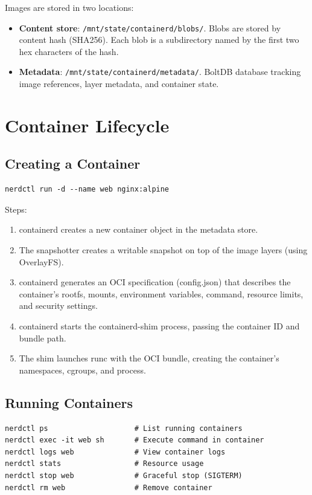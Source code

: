 Images are stored in two locations:

\begin{itemize}[nosep]
  \item \textbf{Content store}: \texttt{/mnt/state/containerd/blobs/}.
        Blobs are stored by content hash (SHA256). Each blob is a
        subdirectory named by the first two hex characters of the hash.
  \item \textbf{Metadata}: \texttt{/mnt/state/containerd/metadata/}.
        BoltDB database tracking image references, layer metadata, and
        container state.
\end{itemize}

\section{Container Lifecycle}

\subsection{Creating a Container}

\begin{lstlisting}
nerdctl run -d --name web nginx:alpine
\end{lstlisting}

Steps:
\begin{enumerate}[nosep]
  \item containerd creates a new container object in the metadata store.
  \item The snapshotter creates a writable snapshot on top of the image
        layers (using OverlayFS).
  \item containerd generates an OCI specification (config.json) that
        describes the container's rootfs, mounts, environment variables,
        command, resource limits, and security settings.
  \item containerd starts the containerd-shim process, passing the
        container ID and bundle path.
  \item The shim launches runc with the OCI bundle, creating the
        container's namespaces, cgroups, and process.
\end{enumerate}

\subsection{Running Containers}

\begin{lstlisting}
nerdctl ps                    # List running containers
nerdctl exec -it web sh       # Execute command in container
nerdctl logs web              # View container logs
nerdctl stats                 # Resource usage
nerdctl stop web              # Graceful stop (SIGTERM)
nerdctl rm web                # Remove container
\end{lstlisting}


